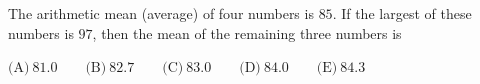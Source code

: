 The arithmetic mean (average) of four numbers is $85$. If the largest of these numbers is $97$, then the mean of the remaining three numbers is



$\text{(A)}\ 81.0 \qquad \text{(B)}\ 82.7 \qquad \text{(C)}\ 83.0 \qquad \text{(D)}\ 84.0 \qquad \text{(E)}\ 84.3$
